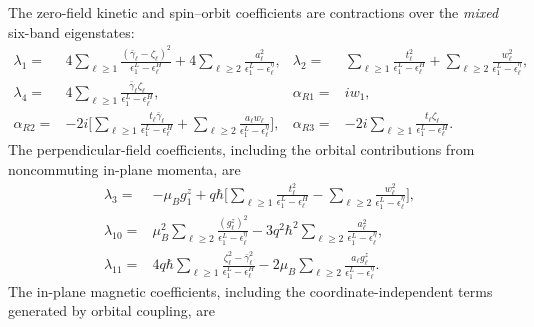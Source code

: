 \documentclass[10pt,letterpaper]{article}
\newcommand{\ep}{\epsilon}
\begin{document}
The zero-field kinetic and spin--orbit coefficients are contractions
over the \emph{mixed} six-band eigenstates:
\begin{align}
 \lambda_1={}&4\sum_{\ell\ge1}
 \frac{(\bar\gamma_\ell-\zeta_\ell)^2}{\ep_1^L-\ep_\ell^H}
 +4\sum_{\ell\ge2}\frac{a_\ell^2}{\ep_1^L-\ep_\ell^\eta},
 &\lambda_2={}&\sum_{\ell\ge1}
 \frac{t_\ell^2}{\ep_1^L-\ep_\ell^H}
 +\sum_{\ell\ge2}\frac{w_\ell^2}{\ep_1^L-\ep_\ell^\eta},\nonumber\\
 \lambda_4={}&4\sum_{\ell\ge1}
 \frac{\bar\gamma_\ell\zeta_\ell}{\ep_1^L-\ep_\ell^H},
 &\alpha_{R1}={}&iw_1,\nonumber\\
 \alpha_{R2}={}&-2i\Biggl[
 \sum_{\ell\ge1}\frac{t_\ell\bar\gamma_\ell}{\ep_1^L-\ep_\ell^H}
 +\sum_{\ell\ge2}\frac{a_\ell w_\ell}{\ep_1^L-\ep_\ell^\eta}\Biggr],
 &\alpha_{R3}={}&-2i\sum_{\ell\ge1}
 \frac{t_\ell\zeta_\ell}{\ep_1^L-\ep_\ell^H}.
 \label{eq:swt6-zero-coeff}
\end{align}
The perpendicular-field coefficients, including the orbital contributions
from noncommuting in-plane momenta, are
\begin{align}
 \lambda_3={}&-\mu_Bg_1^z
 +q\hbar\Biggl[
 \sum_{\ell\ge1}\frac{t_\ell^2}{\ep_1^L-\ep_\ell^H}
 -\sum_{\ell\ge2}\frac{w_\ell^2}{\ep_1^L-\ep_\ell^\eta}\Biggr],\label{eq:swt6-lambda3}\\
 \lambda_{10}={}&\mu_B^2\sum_{\ell\ge2}
 \frac{(g_\ell^z)^2}{\ep_1^L-\ep_\ell^\eta}
 -3q^2\hbar^2\sum_{\ell\ge2}
 \frac{a_\ell^2}{\ep_1^L-\ep_\ell^\eta},\nonumber\\
 \lambda_{11}={}&4q\hbar\sum_{\ell\ge1}
 \frac{\zeta_\ell^2-\bar\gamma_\ell^2}{\ep_1^L-\ep_\ell^H}
 -2\mu_B\sum_{\ell\ge2}
 \frac{a_\ell g_\ell^z}{\ep_1^L-\ep_\ell^\eta}.
 \label{eq:swt6-perp-coeff}
\end{align}
The in-plane magnetic coefficients, including the coordinate-independent
terms generated by orbital coupling, are
\end{document}
